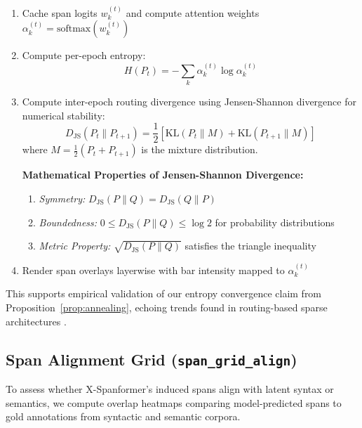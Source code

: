 \begin{enumerate}[leftmargin=1.5em]
  \item Cache span logits \( w_k^{(t)} \) and compute attention weights \( \alpha_k^{(t)} = \mathrm{softmax}(w_k^{(t)}) \)
  \item Compute per-epoch entropy:
  \begin{equation}
    H(P_t) = - \sum_k \alpha_k^{(t)} \log \alpha_k^{(t)}
    \label{eq:entropy_viz}
  \end{equation}
  \item Compute inter-epoch routing divergence using Jensen-Shannon divergence for numerical stability:
  \begin{equation}
    D_{\mathrm{JS}}(P_t \| P_{t+1}) = \frac{1}{2} \left[ \mathrm{KL}(P_t \| M) + \mathrm{KL}(P_{t+1} \| M) \right]
    \label{eq:jsdiv}
  \end{equation}
  where \(M = \frac{1}{2}(P_t + P_{t+1})\) is the mixture distribution.
  
  \textbf{Mathematical Properties of Jensen-Shannon Divergence:}
  \begin{enumerate}[leftmargin=1.5em]
  \item \emph{Symmetry:} \(D_{\mathrm{JS}}(P \| Q) = D_{\mathrm{JS}}(Q \| P)\)
  \item \emph{Boundedness:} \(0 \le D_{\mathrm{JS}}(P \| Q) \le \log 2\) for probability distributions
  \item \emph{Metric Property:} \(\sqrt{D_{\mathrm{JS}}(P \| Q)}\) satisfies the triangle inequality
  \end{enumerate}
  \item Render span overlays layerwise with bar intensity mapped to \( \alpha_k^{(t)} \)
\end{enumerate}

This supports empirical validation of our entropy convergence claim from Proposition~\ref{prop:annealing}, echoing trends found in routing-based sparse architectures \cite{tay2020sparse, shazeer2017outrageously}.

\subsection{Span Alignment Grid (\texttt{span\_grid\_align})}
\label{sec:vis-align}

To assess whether X-Spanformer’s induced spans align with latent syntax or semantics, we compute overlap heatmaps comparing model-predicted spans to gold annotations from syntactic and semantic corpora.


